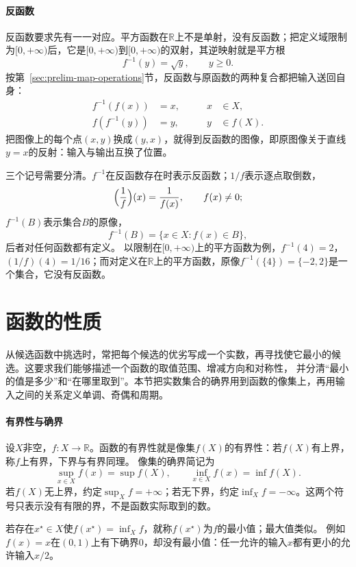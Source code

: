 \paragraph{反函数}
反函数要求先有一一对应。平方函数在$\mathbb R$上不是单射，没有反函数；把定义域限制为$[0,+\infty)$后，它是$[0,+\infty)$到$[0,+\infty)$的双射，其逆映射就是平方根
\[
 f^{-1}(y)=\sqrt y,\qquad y\geq0.
\]
按第~\ref{sec:prelim-map-operations}节，反函数与原函数的两种复合都把输入送回自身：
\[
 \begin{aligned}
 f^{-1}(f(x))&=x, &\qquad x&\in X,\\
 f(f^{-1}(y))&=y, &\qquad y&\in f(X).
 \end{aligned}
\]
把图像上的每个点$(x,y)$换成$(y,x)$，就得到反函数的图像，即原图像关于直线$y=x$的反射：输入与输出互换了位置。

三个记号需要分清。$f^{-1}$在反函数存在时表示反函数；$1/f$表示逐点取倒数，
\[
 \Bigl(\frac1f\Bigr)(x)=\frac1{f(x)},\qquad f(x)\neq0;
\]
$f^{-1}(B)$表示集合$B$的原像，
\[
 f^{-1}(B)=\{x\in X:f(x)\in B\},
\]
后者对任何函数都有定义。
以限制在$[0,+\infty)$上的平方函数为例，$f^{-1}(4)=2$，$(1/f)(4)=1/16$；而对定义在$\mathbb R$上的平方函数，原像$f^{-1}(\{4\})=\{-2,2\}$是一个集合，它没有反函数。

\section{函数的性质}
\label{sec:prelim-optimal-values-errors}
\label{sec:ru-function-properties}

从候选函数中挑选时，常把每个候选的优劣写成一个实数，再寻找使它最小的候选。这要求我们能够描述一个函数的取值范围、增减方向和对称性，
并分清“最小的值是多少”和“在哪里取到”。本节把实数集合的确界用到函数的像集上，再用输入之间的关系定义单调、奇偶和周期。

\paragraph{有界性与确界}
设$X$非空，$f:X\to\mathbb R$。函数的有界性就是像集$f(X)$的有界性：若$f(X)$有上界，称$f$上有界，下界与有界同理。
像集的确界简记为
\[
 \sup_{x\in X}f(x)=\sup f(X),\qquad \inf_{x\in X}f(x)=\inf f(X).
\]
若$f(X)$无上界，约定$\sup_Xf=+\infty$；若无下界，约定$\inf_Xf=-\infty$。这两个符号只表示没有有限的界，不是函数实际取到的数。

若存在$x^\star\in X$使$f(x^\star)=\inf_Xf$，就称$f(x^\star)$为$f$的最小值；最大值类似。
例如$f(x)=x$在$(0,1)$上有下确界$0$，却没有最小值：任一允许的输入$x$都有更小的允许输入$x/2$。

